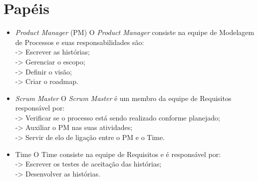 \section{Papéis}

\begin{itemize}
  \item \textit{Product Manager} (PM)
 \subitem O \textit{Product Manager} consiste na equipe de Modelagem de Processos e suas responsabilidades são: \\
      \subitem-> Escrever as histórias;\\
      \subitem-> Gerenciar o escopo; \\
      \subitem-> Definir o visão; \\
      \subitem-> Criar o roadmap.\\

      
  \item \textit{Scrum Master}
 \subitem O  \textit{Scrum Master} é um membro da equipe de Requisitos responsável por: \\
      \subitem-> Verificar se o processo está sendo realizado conforme planejado;\\
      \subitem-> Auxiliar o PM nas suas atividades; \\
      \subitem-> Servir de elo de ligação entre o PM e o Time. \\

  \item Time
 \subitem O  Time consiste na equipe de Requisitos e é responsável por: \\
      \subitem-> Escrever os testes de aceitação das histórias;\\
      \subitem-> Desenvolver as histórias. \\
\end{itemize}
